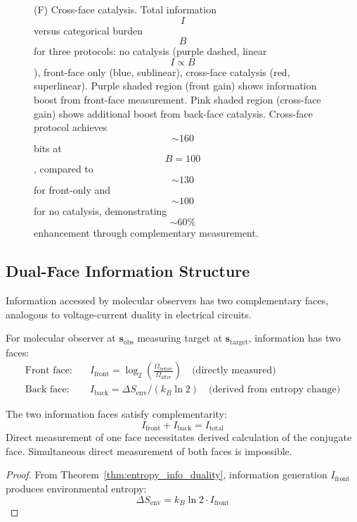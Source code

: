 \begin{theorem}
\begin{figure}[htbp]
{    (F) Cross-face catalysis. Total information $$I$$ versus categorical burden $$B$$ for three protocols: no catalysis (purple dashed, linear $$I \propto B$$), front-face only (blue, sublinear), cross-face catalysis (red, superlinear). Purple shaded region (front gain) shows information boost from front-face measurement. Pink shaded region (cross-face gain) shows additional boost from back-face catalysis. Cross-face protocol achieves $$\sim 160$$ bits at $$B=100$$, compared to $$\sim 130$$ for front-only and $$\sim 100$$ for no catalysis, demonstrating $$\sim 60\%$$ enhancement through complementary measurement.}
    \label{fig:molecular_observers}
    \end{figure}

\subsection{Dual-Face Information Structure}

Information accessed by molecular observers has two complementary faces, analogous to voltage-current duality in electrical circuits.

\begin{definition}
\label{def:info_faces}
For molecular observer at $\mathbf{s}_{\text{obs}}$ measuring target at $\mathbf{s}_{\text{target}}$, information has two faces:
\begin{align}
\text{Front face:} \quad & I_{\text{front}} = \log_2\left(\frac{\Omega_{\text{before}}}{\Omega_{\text{after}}}\right) \quad \text{(directly measured)} \\
\text{Back face:} \quad & I_{\text{back}} = \Delta S_{\text{env}}/(k_B \ln 2) \quad \text{(derived from entropy change)}
\end{align}
\end{definition}

\begin{theorem}
\label{thm:face_complementarity}
The two information faces satisfy complementarity:
\begin{equation}
I_{\text{front}} + I_{\text{back}} = I_{\text{total}}
\end{equation}
Direct measurement of one face necessitates derived calculation of the conjugate face. Simultaneous direct measurement of both faces is impossible.
\end{theorem}

\begin{proof}
From Theorem~\ref{thm:entropy_info_duality}, information generation $I_{\text{front}}$ produces environmental entropy:
\begin{equation}
\Delta S_{\text{env}} = k_B \ln 2 \cdot I_{\text{front}}
\end{equation}


\end{proof}
\end{theorem}
